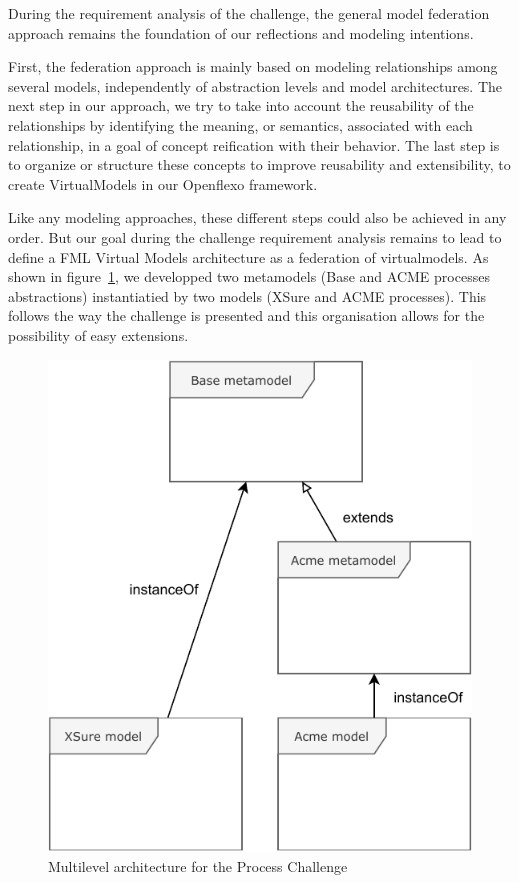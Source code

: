 
During the requirement analysis of the challenge, the general model federation approach remains the foundation of our reflections and modeling intentions. 

First, the federation approach is mainly based on modeling relationships among several models, independently of abstraction levels and model architectures.
The next step in our approach, we try to take into account the reusability of the relationships by identifying the meaning, or semantics, associated with each relationship, in a goal of concept reification with their behavior. The last step is to organize or structure these concepts to improve reusability and extensibility, to create VirtualModels in our Openflexo framework.     

Like any modeling approaches, these different steps could also be achieved in any order. But our goal during the challenge requirement analysis remains to lead to define a FML Virtual Models architecture as a federation of virtualmodels. As shown in figure~\ref{fig:MultilevelArchitecture}, we developped two metamodels (Base and ACME processes abstractions) instantiatied by two models (XSure and ACME processes). This follows the way the challenge is presented and this organisation allows for the possibility of easy extensions.

\begin{figure}
    \centering
    \includegraphics[width=0.7 \columnwidth]{Figures/MultilevelArchitecture.pdf}
    \caption{Multilevel architecture for the Process Challenge}
    \label{fig:MultilevelArchitecture}
\end{figure}

